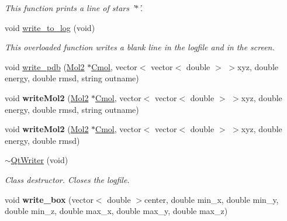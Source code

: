 \begin{DoxyCompactItemize}
\begin{DoxyCompactList}\small\item\em This function prints a line of stars '$\ast$'. \item\end{DoxyCompactList}\item 
\hypertarget{classQtWriter_a6188e31823cda6193af9ac3632fb19db}{
void \hyperlink{classQtWriter_a6188e31823cda6193af9ac3632fb19db}{write\_\-to\_\-log} (void)}
\label{classQtWriter_a6188e31823cda6193af9ac3632fb19db}

\begin{DoxyCompactList}\small\item\em This overloaded function writes a blank line in the logfile and in the screen. \item\end{DoxyCompactList}\item 
void \hyperlink{classQtWriter_ab8c11ceff2dd119f9a6ebde4963daaf5}{write\_\-pdb} (\hyperlink{classMol2}{Mol2} $\ast$\hyperlink{classQtWriter_af3696b3d26d4be8fce7ab77f2773b9e2}{Cmol}, vector$<$ vector$<$ double $>$ $>$xyz, double energy, double rmsd, string outname)
\item 
\hypertarget{classQtWriter_aa10902e50984e155cee195cc813fe99e}{
void {\bfseries writeMol2} (\hyperlink{classMol2}{Mol2} $\ast$\hyperlink{classQtWriter_af3696b3d26d4be8fce7ab77f2773b9e2}{Cmol}, vector$<$ vector$<$ double $>$ $>$xyz, double energy, double rmsd, string outname)}
\label{classQtWriter_aa10902e50984e155cee195cc813fe99e}

\item 
\hypertarget{classQtWriter_a0a33a44f386f1311cf6833eb3e738551}{
void {\bfseries writeMol2} (\hyperlink{classMol2}{Mol2} $\ast$\hyperlink{classQtWriter_af3696b3d26d4be8fce7ab77f2773b9e2}{Cmol}, vector$<$ vector$<$ double $>$ $>$xyz, double energy, double rmsd)}
\label{classQtWriter_a0a33a44f386f1311cf6833eb3e738551}

\item 
\hypertarget{classQtWriter_a255879a3ac447bd5e481042e73f33974}{
\hyperlink{classQtWriter_a255879a3ac447bd5e481042e73f33974}{$\sim$QtWriter} (void)}
\label{classQtWriter_a255879a3ac447bd5e481042e73f33974}

\begin{DoxyCompactList}\small\item\em Class destructor. Closes the logfile. \item\end{DoxyCompactList}\item 
\hypertarget{classQtWriter_ae7d17527c50d60fd62aed7effbc25a4a}{
void {\bfseries write\_\-box} (vector$<$ double $>$center, double min\_\-x, double min\_\-y, double min\_\-z, double max\_\-x, double max\_\-y, double max\_\-z)}
\label{classQtWriter_ae7d17527c50d60fd62aed7effbc25a4a}

\end{DoxyCompactItemize}
